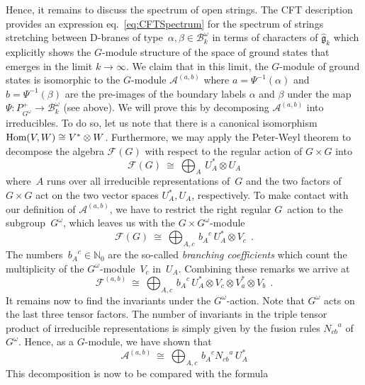 \documentclass[12pt,a4paper]{article}
\newcommand{\Natural}{\mathbb{N}}
\newcommand{\mf}{\mathfrak} %
\newcommand{\mc}{\mathcal} %
\def\Iso{\Psi}
\def\iG{G^\omega} %
\def\bL{\mc{B}} %
\def\tareps{\bL^\omega_k} %
\def\Hom{{\text{\rm Hom}}} %
\def\asg{{\hat{\mf{g}}}}
\def\a{\alpha}
\def\b{\beta}
\begin{document}
Hence, it remains to discuss the spectrum of open strings.
The CFT description provides an expression eq.~\eqref{eq:CFTSpectrum}
for the spectrum of strings stretching between D-branes of 
type~$\alpha,\beta\in\tareps$ in terms of characters of
$\asg_k$ which explicitly shows the $G$-module structure 
of the space of ground states that emerges in the limit 
$k\rightarrow\infty$. We claim that in this limit, the $G$-module 
of ground states is isomorphic to the $G$-module $\mc{A}^{(a,b)}$ 
where $a=\Iso^{-1}(\alpha)$ and $b=\Iso^{-1}(\beta)$ 
are the pre-images of the boundary labels $\a$ and $\b$ under the 
map $\Iso: P^+_{\iG} \rightarrow \tareps$ (see above). We 
will prove this by decomposing  $\mc{A}^{(a,b)}$ into irreducibles. 
To do so, let us note that there is a canonical isomorphism $\Hom(V,W)
\cong V^\ast\otimes W$. Furthermore, we may apply the Peter-Weyl 
theorem to decompose the algebra $\mc{F}(G)$ with respect to the 
regular action of $G\times G$ into
\begin{equation*}
  \mc{F}(G)\ \cong \ {\bigoplus}_{A}\, U_A^\ast\otimes U_A
\end{equation*}
where~$A$ runs over all irreducible representations of~$G$
and the two factors of~$G\times G$ act on the two vector spaces
$U_A^\ast,U_A$, respectively. To make contact with our definition of 
$\mc{A}^{(a,b)}$, we have to restrict the right regular $G$~action 
to the subgroup~$\iG$, which leaves us with the 
$G \times \iG$-module 
\begin{equation*}
  \mc{F}(G)\ \cong \ {\bigoplus}_{A,c}\, {b_A}^c\, U_A^\ast\otimes V_c\ \ .
\end{equation*}
The numbers~${b_A}^c\in\Natural_0$ are the so-called {\em branching 
coefficients} which count the multiplicity of the $\iG$-module~$V_c$ 
in~$U_A$. Combining these remarks we arrive at 
\begin{equation*}
  \mc{F}^{(a,b)}
  \ \cong\  \bigoplus_{A,c}\, {b_A}^c\, U_A^\ast
   \otimes V_c\otimes V_a^\ast\otimes V_b \ \ . 
\end{equation*}
It remains now to find the invariants under the $\iG$-action. 
Note that $\iG$ acts on the last three tensor factors. The 
number of invariants in the triple tensor product of irreducible 
representations is simply given by the fusion rules ${N_{cb}}^a$ 
of $\iG$. Hence, as a $G$-module, we have shown that  
\begin{equation*}
  \mc{A}^{(a,b)}
  \ \cong \ \bigoplus_{A,c}\, {b_A}^c{N_{cb}}^a\, U_A^\ast
\end{equation*}
This decomposition is now to be compared with the formula 
\end{document}

